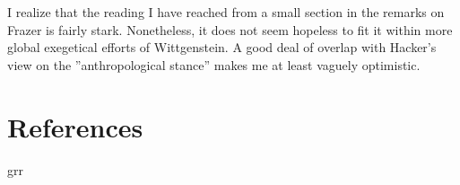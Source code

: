 \documentclass{article}
\begin{document}
I realize that the reading I have reached from a small section in the remarks on Frazer is fairly stark. Nonetheless, it does not seem hopeless to fit it within more global exegetical efforts of Wittgenstein. A good deal of overlap with Hacker's view on the ''anthropological stance'' makes me at least vaguely optimistic.

\section{References}
\hypertarget{sec5}{grr}
\end{document}
